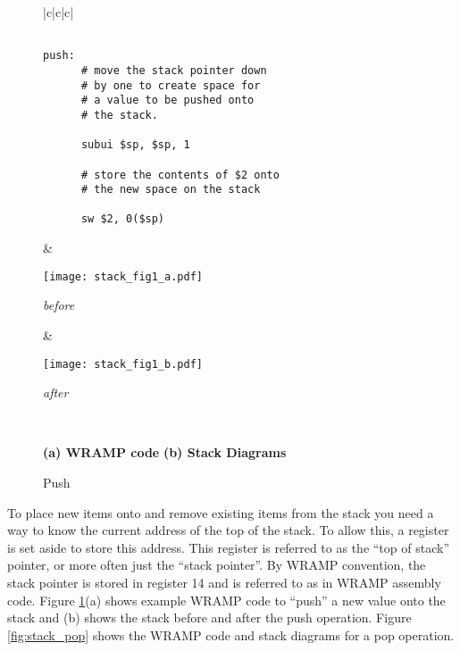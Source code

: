 %
%
\begin{figure}[!hb]
\begin{center}
\begin{footnotesize}
\begin{tabular}{|c|c|c|}

\hline
\begin{minipage}[l]{7cm}
\vspace{\topsep}
\begin{verbatim}

push:
      # move the stack pointer down
      # by one to create space for 
      # a value to be pushed onto 
      # the stack.

      subui $sp, $sp, 1

      # store the contents of $2 onto
      # the new space on the stack

      sw $2, 0($sp)

\end{verbatim}
\end{minipage}
&
\begin{minipage}[c]{3.5cm}
\begin{center}
\texttt{[image: stack\_fig1\_a.pdf]}

\emph{before}\\
\end{center}
\end{minipage}

&
\begin{minipage}[c]{3.5cm}
\begin{center}
\texttt{[image: stack\_fig1\_b.pdf]}


\emph{after}\\
\end{center}
\end{minipage}
\\
\hline
\end{tabular}
\begin{center}
\small{
\textbf{(a) WRAMP code}
\hspace{3.5cm}
\textbf{(b) Stack Diagrams}
}
\end{center}

\caption{Push}
\label{fig:stack_push}
\end{footnotesize}
\end{center}
\end{figure}
%
%

To place new items onto and remove existing items from the stack you
need a way to know the current address of the top of the stack. To
allow this, a register is set aside to store this address. This
register is referred to as the ``top of stack'' pointer, or more often
just the ``stack pointer''. By WRAMP convention, the stack pointer is stored
in register 14 and is referred to as  in WRAMP assembly code.
Figure \ref{fig:stack_push}(a) shows example WRAMP code to ``push'' a new
value onto the stack and (b) shows the stack before and after the push operation. Figure \ref{fig:stack_pop} shows the WRAMP code and stack diagrams for a pop
operation.

